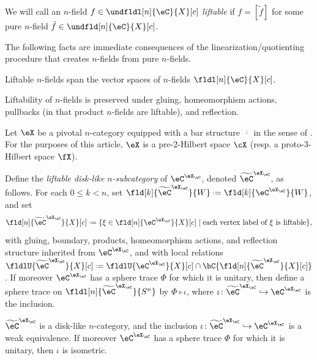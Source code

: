 \documentclass[12pt,reqno]{amsart}
\newcommand{\psn}{\Phi}
\newcommand{\C}{\eC}
\newcommand{\fcj}[1]{\overline{#1}}
\newcommand{\defn}[1]{\emph{#1}}
\DeclareRobustCommand{\coloneq}{\mathrel{\vcenter{\baselineskip0.5ex\lineskiplimit0pt\hbox{\scriptsize{\upshape.}}\hbox{\scriptsize{\upshape.}}}}=}
\begin{document}
\begin{definition}
\label{def:liftable}
  We will call an $n$-field $f \in \undfldl[n]{\C}{X}[ c]$ \defn{liftable} if $f = [\tilde{f}]$ for some
  pure $n$-field $\tilde{f} \in \undfld[n]{\C}{X}[ c]$.
\end{definition}

The following facts are immediate consequences of the linearization/quotienting procedure that creates $n$-fields from pure $n$-fields.

\begin{facts}
\label{facts:liftable-properties}
  \begin{lst}
    \item[(i)]\label{facts:liftable-properties-1} Liftable $n$-fields span the vector spaces of $n$-fields $\fldl[n]{\C}{X}[ c]$.
    \item[(ii)]\label{facts:liftable-properties-2} Liftability of $n$-fields is preserved under gluing, homeomorphism actions, pullbacks (in that product $n$-fields are liftable), and reflection.
  \end{lst}
\end{facts}

\begin{construction}
Let $\eX$ be a pivotal $n$-category equipped with a bar structure $\fcj{\,\cdot\,}$ in the sense of \cite{W21}. For the purposes of this article, $\eX$ is a pre-2-Hilbert space $\cX$ (resp. a proto-3-Hilbert space $\fX$). 

Define the \defn{liftable disk-like $n$-subcategory} of $\C^{\eX_\C}$, denoted $\widetilde{\C}^{\eX_\C}$, as follows. For each $0\leq k< n$, set 
$\fld[k]{\widetilde{\C}^{\eX_\C}}{W}\coloneq\fld[k]{\C^{\eX_\C}}{W}$, and set
\[
\fld[n]{\widetilde{\C}^{\eX_\C}}{X}[c]\coloneq\{\xi\in\fld[n]{\C^{\eX_\C}}{X}[c]\mid \text{each vertex label of }\xi\text{ is liftable}\},
\]
with gluing, boundary, products, homeomorphism actions, and reflection structure inherited from $\C^{\eX_\C}$, and with local relations $\fldlU{\widetilde{\C}^{\eX_\C}}{X}[c]\coloneq\fldlU{\C^{\eX_\C}}{X}[c]\cap\bC\{\fld[n]{{\widetilde{\C}^{\eX_\C}}}{X}[c]\}$. If moreover $\C^{\eX_\C}$ has a sphere trace $\psn$ for which it is unitary, then define a sphere trace on $\fldl[n]{\widetilde{\C}^{\eX_\C}}{S^n}$ by $\psn\circ\iota$, where $\iota\colon\widetilde{\C}^{\eX_\C}\hookrightarrow\C^{\eX_\C}$ is the inclusion.
\end{construction}

\begin{lemma}
\label{lem:tilde-inclusion}
$\widetilde{\C}^{\eX_\C}$ is a disk-like $n$-category, and the inclusion $\iota\colon{\widetilde{\C}^{\eX_\C}}\hookrightarrow\C^{\eX_\C}$ is a weak equivalence.
If moreover $\C^{\eX_\C}$ has a sphere trace $\psn$ for which it is unitary, then $\iota$ is isometric.
\end{lemma}
\end{document}
